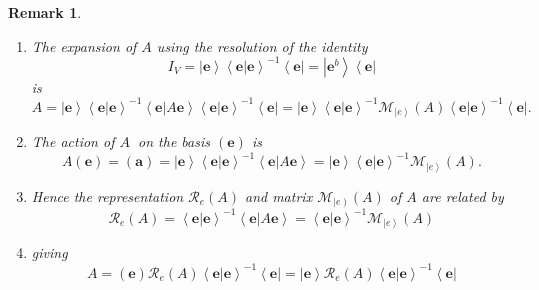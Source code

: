 \documentclass[aps,preprint]{revtex4}%
\newtheorem{remark}[theorem]{Remark}
\begin{document}
\begin{remark}
\begin{enumerate}
\item The expansion of $A$ using the resolution of the identity
\begin{equation}
I_{V}=\left\vert \mathbf{e}\right\rangle \left\langle \left.  \mathbf{e}%
\right\vert \mathbf{e}\right\rangle ^{-1}\left\langle \mathbf{e}\right\vert
=\left\vert \mathbf{e}^{b}\right\rangle \left\langle \mathbf{e}\right\vert
\end{equation}
is%
\begin{equation}
A=\left\vert \mathbf{e}\right\rangle \left\langle \left.  \mathbf{e}%
\right\vert \mathbf{e}\right\rangle ^{-1}\left\langle \left.  \mathbf{e}%
\right\vert A\mathbf{e}\right\rangle \left\langle \left.  \mathbf{e}%
\right\vert \mathbf{e}\right\rangle ^{-1}\left\langle \mathbf{e}\right\vert
=\left\vert \mathbf{e}\right\rangle \left\langle \left.  \mathbf{e}\right\vert
\mathbf{e}\right\rangle ^{-1}\mathcal{M}_{\left\vert e\right\rangle }\left(
A\right)  \left\langle \left.  \mathbf{e}\right\vert \mathbf{e}\right\rangle
^{-1}\left\langle \mathbf{e}\right\vert .
\end{equation}


\item The action of $A\ $ on the basis $\left(  \mathbf{e}\right)  $ is
\begin{equation}
A\left(  \mathbf{e}\right)  =\left(  \mathbf{a}\right)  =\left\vert
\mathbf{e}\right\rangle \left\langle \left.  \mathbf{e}\right\vert
\mathbf{e}\right\rangle ^{-1}\left\langle \left.  \mathbf{e}\right\vert
A\mathbf{e}\right\rangle =\left\vert \mathbf{e}\right\rangle \left\langle
\left.  \mathbf{e}\right\vert \mathbf{e}\right\rangle ^{-1}\mathcal{M}%
_{\left\vert e\right\rangle }\left(  A\right)  .
\end{equation}


\item Hence the representation $\mathcal{R}_{e}\left(  A\right)  $ and matrix
$\mathcal{M}_{\left\vert e\right)  }\left(  A\right)  $ of $A$ are related by
\begin{equation}
\mathcal{R}_{e}\left(  A\right)  =\left\langle \left.  \mathbf{e}\right\vert
\mathbf{e}\right\rangle ^{-1}\left\langle \left.  \mathbf{e}\right\vert
A\mathbf{e}\right\rangle =\left\langle \left.  \mathbf{e}\right\vert
\mathbf{e}\right\rangle ^{-1}\mathcal{M}_{\left\vert e\right\rangle }\left(
A\right)
\end{equation}


\item giving
\begin{equation}
A=\left(  \mathbf{e}\right)  \mathcal{R}_{e}\left(  A\right)  \left\langle
\left.  \mathbf{e}\right\vert \mathbf{e}\right\rangle ^{-1}\left\langle
\mathbf{e}\right\vert =\left\vert \mathbf{e}\right\rangle \mathcal{R}%
_{e}\left(  A\right)  \left\langle \left.  \mathbf{e}\right\vert
\mathbf{e}\right\rangle ^{-1}\left\langle \mathbf{e}\right\vert
\end{equation}



\end{enumerate}
\end{remark}
\end{document}
